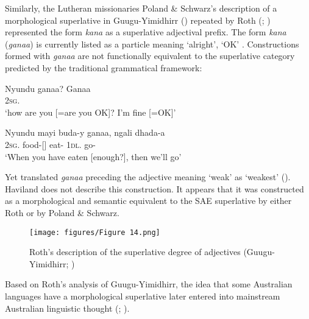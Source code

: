 Similarly, the Lutheran missionaries Poland \& Schwarz’s description of a morphological superlative in Guugu-Yimidhirr (\citeyear[no pag.]{schwarz_koko_1900}) repeated by Roth (\citeyear[26]{roth_structure_1901}; ) represented the form \textit{kana} as a superlative adjectival prefix. The form \textit{kana} (\textit{ganaa}) is currently listed as a particle meaning `alright', `OK' \citep[169]{haviland_guugu_1979}. Constructions formed with \textit{ganaa} are not functionally equivalent to the superlative category predicted by the traditional grammatical framework:

\ea
\gll Nyundu ganaa? Ganaa \\
2\textsc{sg}.  \\
\glt `how are you [=are you OK]? I’m fine [=OK]' \\
\citep[152]{haviland_guugu_1979} 
\z

\ea
\gll Nyundu mayi buda-y ganaa, ngali dhada-a \\
2\textsc{sg}. food-[] eat-  1\textsc{dl}. go-\\
\glt `When you have eaten [enough?], then we’ll go' \\
\citep[152]{haviland_guugu_1979}
\z

Yet \citet[26]{roth_structure_1901} translated \textit{ganaa} preceding the adjective meaning `weak' as `weakest' (). Haviland does not describe this construction. It appears that it was constructed as a morphological and semantic equivalent to the SAE superlative by either Roth or by Poland \& Schwarz.

\begin{figure}
\texttt{[image: figures/Figure 14.png]}
\caption{Roth’s description of the superlative degree of adjectives (Guugu-Yimidhirr; \citealt[26]{roth_structure_1901})}
\label{fig:key:2-14}
\end{figure} 

Based on Roth’s analysis of Guugu-Yimidhirr, the idea that some Australian languages have a morphological superlative later entered into mainstream Australian linguistic thought (\citealt[165]{elkin_nature_1937}; \citealt[55]{capell_structure_1937}).


